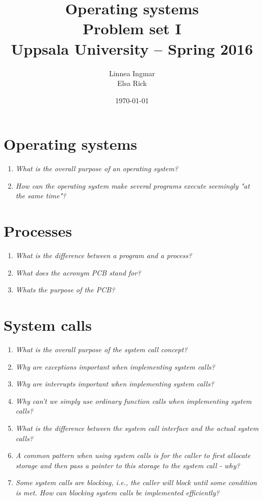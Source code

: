 \documentclass[a4paper]{article}
\title{\textbf{Operating systems \\
    Problem set I \\
    Uppsala University -- Spring 2016 \\}}
\author{Linnea Ingmar \\
  Elsa Rick}
\date{\today}
\begin{document}
\maketitle

\section{Operating systems}
\begin{enumerate}
  \item \textit{What is the overall purpose of an operating system?}
  \item \textit{How can the operating system make several programs execute seemingly "at the same time"?}
\end{enumerate}

\section{Processes}
\begin{enumerate}
  \item \textit{What is the difference between a program and a process?}
  \item \textit{What does the acronym PCB stand for?}
  \item \textit{Whats the purpose of the PCB?}
  
\end{enumerate}

\section{System calls}
\begin{enumerate}
  \item \textit{What is the overall purpose of the system call concept? }
  \item \textit{Why are exceptions important when implementing system calls?}
  \item \textit{Why are interrupts important when implementing system calls?}
  \item \textit{Why can't we simply use ordinary function calls when implementing system calls?}
  \item \textit{What is the difference between the system call interface and the actual system calls?}
  \item \textit{A common pattern when using system calls is for the caller to first allocate storage and then pass a pointer to this storage to the system call - why?}
  \item \textit{Some system calls are blocking, i.e., the caller will block until some condition is met. How can blocking system calls be implemented efficiently?}
  
\end{enumerate}
\end{document}
